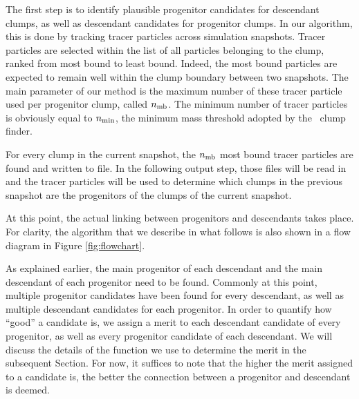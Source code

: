 The first step is to identify plausible progenitor candidates for
descendant clumps, as well as descendant candidates for progenitor
clumps.  In our algorithm, this is done by tracking tracer particles
across simulation snapshots. Tracer particles are selected within the
list of all particles belonging to the clump, ranked from most bound
to least bound. Indeed, the most bound particles are expected to
remain well within the clump boundary between two snapshots.  The main
parameter of our method is the maximum number of these tracer particle
used per progenitor clump, called $n_{\rm mb}$.  The minimum number of
tracer particles is obviously equal to $n_{\rm min}$, the minimum mass
threshold adopted by the \phew\ clump finder.

For every clump in the current snapshot, the $n_{\rm mb}$
most bound tracer particles are found and written to file. In the following
output step, those files will be read in and the tracer particles
will be used to determine which clumps in the previous snapshot are the 
progenitors of the clumps of the current snapshot.

At this point, the actual linking between progenitors and descendants 
takes place. For clarity, the algorithm that we describe in what follows 
is also shown in a flow diagram in Figure \ref{fig:flowchart}.

As explained earlier, the main progenitor of each descendant and the
main descendant of each progenitor need to be found. Commonly at this point, 
multiple progenitor candidates have been found for every descendant,
as well as multiple descendant candidates for each progenitor. In order
to quantify how ``good'' a candidate is, we assign a merit to each descendant
candidate of every progenitor, as well as every progenitor candidate of 
each descendant. We will discuss the details of the function we use to determine
the merit in the subsequent Section. For now, it suffices to note that the higher
the merit assigned to a candidate is, the better the connection between a progenitor
and descendant is deemed.

